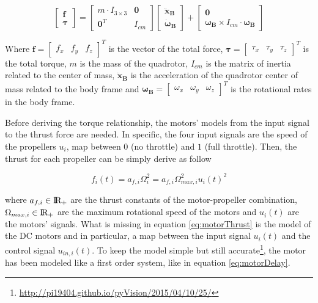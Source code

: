 \begin{equation}
	\begin{bmatrix}
		\mathbf{f} \\
		\boldsymbol{\tau}
	\end{bmatrix}
	=
	\begin{bmatrix}
		m \cdot I_{3\times 3} & \mathbf{0} \\
		\mathbf{0}^T & I_{cm}
	\end{bmatrix}
	\begin{bmatrix}
		\mathbf{\ddot{x}_B} \\
		\boldsymbol{\dot{\omega}_B}
	\end{bmatrix}
	+
	\begin{bmatrix}
		\mathbf{0} \\
		\boldsymbol{\omega_B} \times I_{cm} \cdot \boldsymbol{\omega_B}
	\end{bmatrix}
	\label{eq:NewtonEuler}
\end{equation}

\noindent Where $\mathbf{f} = \begin{bmatrix} f_x & f_y & f_z \end{bmatrix}^T$ is the vector of the total force, $\boldsymbol{\tau} = \begin{bmatrix} \tau_x & \tau_y & \tau_z \end{bmatrix}^T$ is the total torque, $m$ is the mass of the quadrotor, $I_{cm}$ is the matrix of inertia related to the center of mass, $\mathbf{\ddot{x}_B}$ is the acceleration of the quadrotor center of mass related to the body frame and $\boldsymbol{\omega_B} = \begin{bmatrix} \omega_x & \omega_y & \omega_z \end{bmatrix}^T$ is the rotational rates in the body frame.

\noindent Before deriving the torque relationship, the motors' models from the input signal to the thrust force are needed. In specific, the four input signals are the speed of the propellers $u_i$, map between $0$ (no throttle) and $1$ (full throttle). Then, the thrust for each propeller can be simply derive as follow \cite{modelIdentification}

\begin{equation}
	f_i(t) = a_{f,i} \Omega_i^2 = a_{f,i}\Omega_{max, i}^2 u_i(t)^2
	\label{eq:motorThrust}
\end{equation}

\noindent where $a_{f,i} \in \rm I\!R_+$ are the thrust constants of the motor-propeller combination, $\Omega_{max, i} \in \rm I\!R_+$ are the maximum rotational speed of the motors and $u_i(t)$ are the motors' signals. What is missing in equation \eqref{eq:motorThrust} is the model of the DC motors and in particular, a map between the input signal $u_i(t)$ and the control signal $u_{in,i}(t)$. To keep the model simple but still accurate\footnote{\url{http://pi19404.github.io/pyVision/2015/04/10/25/}}, the motor has been modeled like a first order system, like in equation \eqref{eq:motorDelay}.

